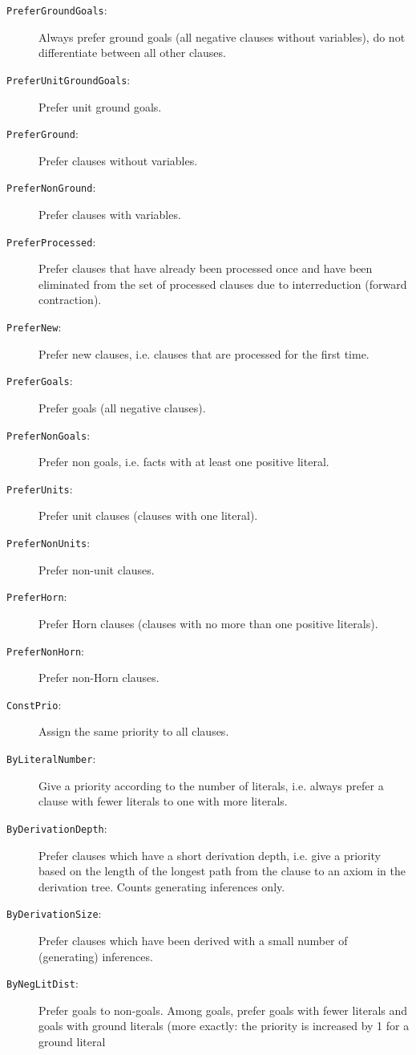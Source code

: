 \documentclass{report}
\begin{document}
\begin{description}
\item[\texttt{PreferGroundGoals}:] Always prefer ground goals (all
  negative clauses without variables), do not differentiate between
  all other clauses.
\item[\texttt{PreferUnitGroundGoals}:] Prefer unit ground goals.
\item[\texttt{PreferGround}:] Prefer clauses without variables.
\item[\texttt{PreferNonGround}:] Prefer clauses with variables.
\item[\texttt{PreferProcessed}:] Prefer clauses that have already been
  processed once and have been eliminated from the set of processed
  clauses due to interreduction (forward contraction).
\item[\texttt{PreferNew}:] Prefer new clauses, i.e. clauses that are
  processed for the first time.
\item[\texttt{PreferGoals}:] Prefer goals (all negative clauses).
\item[\texttt{PreferNonGoals}:] Prefer non goals, i.e. facts with at
  least one positive literal.
\item[\texttt{PreferUnits}:] Prefer unit clauses (clauses with one
  literal).
\item[\texttt{PreferNonUnits}:] Prefer non-unit clauses.
\item[\texttt{PreferHorn}:] Prefer Horn clauses (clauses with no more
  than one positive literals).
\item[\texttt{PreferNonHorn}:] Prefer non-Horn clauses.
\item[\texttt{ConstPrio}:] Assign the same priority to all clauses.
\item[\texttt{ByLiteralNumber}:] Give a priority according to the
  number of literals, i.e. always prefer a clause with fewer literals
  to one with more literals.
\item[\texttt{ByDerivationDepth}:] Prefer clauses which have a short
  derivation depth, i.e. give a priority based on the length of the
  longest path from the clause to an axiom in the derivation
  tree. Counts generating inferences only.
\item[\texttt{ByDerivationSize}:] Prefer clauses which have been
  derived with a small number of (generating) inferences.
\item[\texttt{ByNegLitDist}:] Prefer goals to non-goals. Among goals,
  prefer goals with fewer literals and goals with ground literals
  (more exactly: the priority is increased by 1 for a ground literal

\end{description}
\end{document}
